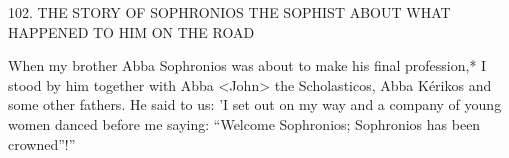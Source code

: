 102.
THE STORY OF SOPHRONIOS THE SOPHIST
ABOUT WHAT HAPPENED TO HIM ON THE ROAD

When my brother Abba Sophronios was about to make his final
profession,* I stood by him together with Abba <John> the
Scholasticos, Abba Kérikos and some other fathers.
He said to us:
'I set out on my way and a company of young women danced
before me saying: “Welcome Sophronios; Sophronios has been
crowned”!”

